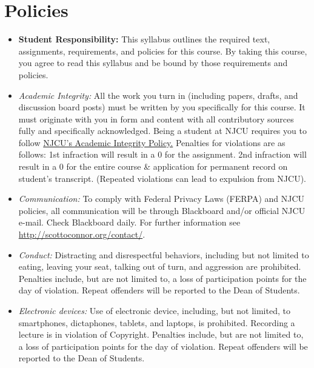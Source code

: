 \documentclass[article,oneside]{memoir}
\begin{document}
\section{Policies}

\begin{itemize}

\item \textbf{Student Responsibility:} This syllabus outlines the required text, assignments, requirements, and policies for this course. By taking this course, you agree to read this syllabus and be bound by those requirements and policies. 

 \item \textit{Academic Integrity:} All the work you turn in (including papers, drafts, and discussion board posts) must be written by you specifically for this course. It must originate with you in form and content with all contributory sources fully and specifically acknowledged. Being a student at NJCU requires you to follow \href{http://scottoconnor.org/resources/Plagiarism.pdf}{NJCU's Academic Integrity Policy.} Penalties for violations are as follows: 1st infraction will result in a 0 for the assignment.  2nd infraction will result in a 0 for the entire course \& application for permanent record on student's transcript. (Repeated violations can lead to expulsion from NJCU). 


\item \textit{Communication:} To comply with Federal Privacy Laws (FERPA) and NJCU policies, all communication will be through Blackboard and/or official NJCU e-mail. Check Blackboard daily. For further information see \href{http://scottoconnor.org/contact/}{http://scottoconnor.org/contact/}.

\item \textit{Conduct:} Distracting and disrespectful behaviors, including but not limited to eating, leaving your seat, talking out of turn, and aggression are prohibited. Penalties include, but are not limited to, a loss of participation points for the day of violation. Repeat offenders will be reported to the Dean of Students. 

\item \textit{Electronic devices:} Use of electronic device, including, but not limited, to smartphones, dictaphones, tablets, and laptops, is prohibited. Recording a lecture is in violation of Copyright. Penalties include, but are not limited to, a loss of participation points for the day of violation. Repeat offenders will be reported to the Dean of Students.


\end{itemize}
\end{document}
